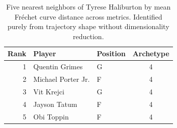 \begin{table}[htbp]
  \centering\small
  \begin{tabular}{rllc}
    \toprule
    Rank & Player & Position & Archetype \\
    \midrule
    1 & Quentin Grimes & G & 4 \\
    2 & Michael Porter Jr. & F & 4 \\
    3 & Vit Krejci & G & 4 \\
    4 & Jayson Tatum & F & 4 \\
    5 & Obi Toppin & F & 4 \\
    \bottomrule
  \end{tabular}
  \caption{Five nearest neighbors of Tyrese Haliburton by mean Fr\'{e}chet curve distance across metrics. Identified purely from trajectory shape without dimensionality reduction.}
  \label{tab:Tyrese_Haliburton_frechet_curve_neighbors}
\end{table}

